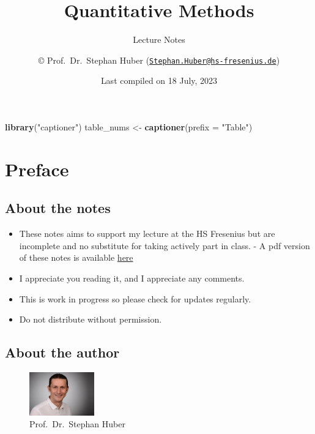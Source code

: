 \documentclass[
  12pt,
  oneside]{book}
\title{Quantitative Methods}
\subtitle{Lecture Notes}
\author{© Prof.~Dr.~Stephan Huber (\href{mailto:Stephan.Huber@hs-fresenius.de}{\nolinkurl{Stephan.Huber@hs-fresenius.de}})}
\date{Last compiled on 18 July, 2023}
\newenvironment{Shaded}{\begin{snugshade}}{\end{snugshade}}
\newcommand{\AttributeTok}[1]{\textcolor[rgb]{0.13,0.29,0.53}{#1}}
\newcommand{\FunctionTok}[1]{\textcolor[rgb]{0.13,0.29,0.53}{\textbf{#1}}}
\newcommand{\NormalTok}[1]{#1}
\newcommand{\OtherTok}[1]{\textcolor[rgb]{0.56,0.35,0.01}{#1}}
\newcommand{\StringTok}[1]{\textcolor[rgb]{0.31,0.60,0.02}{#1}}
\providecommand{\tightlist}{%
  \setlength{\itemsep}{0pt}\setlength{\parskip}{0pt}}
\theoremstyle{definition}
\theoremstyle{definition}
\theoremstyle{definition}
\theoremstyle{definition}
\theoremstyle{remark}
\begin{document}
\maketitle

{
\hypersetup{linkcolor=}
\setcounter{tocdepth}{2}
\tableofcontents
}
\begin{Shaded}
\begin{Highlighting}[]
\FunctionTok{library}\NormalTok{(}\StringTok{"captioner"}\NormalTok{)}
\NormalTok{table\_nums }\OtherTok{\textless{}{-}} \FunctionTok{captioner}\NormalTok{(}\AttributeTok{prefix =} \StringTok{"Table"}\NormalTok{)}
\end{Highlighting}
\end{Shaded}

\hypertarget{preface}{%
\chapter*{Preface}\label{preface}}

\hypertarget{about-the-notes}{%
\section*{About the notes}\label{about-the-notes}}

\begin{itemize}
\tightlist
\item
  These notes aims to support my lecture at the HS Fresenius but are incomplete and no substitute for taking actively part in class. - A pdf version of these notes is available \href{https://raw.githubusercontent.com/hubchev/hubchev.github.io/main/qm/_main.pdf}{here}
\item
  I appreciate you reading it, and I appreciate any comments.
\item
  This is work in progress so please check for updates regularly.
\item
  Do not distribute without permission.
\end{itemize}

\hypertarget{about-the-author}{%
\section*{About the author}\label{about-the-author}}

\begin{figure}
\centering
\includegraphics[width=0.25\textwidth,height=\textheight]{fig/huber2.jpeg}
\caption[\label{fig:itsme} Prof.~Dr.~Stephan Huber]{\label{fig:itsme} Prof.~Dr.~Stephan Huber\footnotemark{}}
\end{figure}
\end{document}
